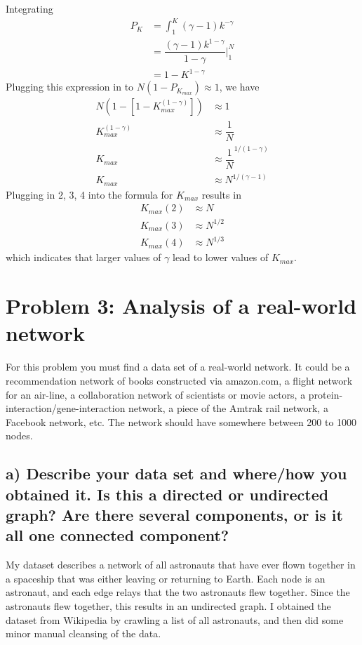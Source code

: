 \documentclass{tufte-handout}
\begin{document}
Integrating
\begin{align*}
P_K &= \int_1^K (\gamma - 1) k^{- \gamma} \\
    &= \dfrac{(\gamma - 1) k^{1 - \gamma}}{1 - \gamma} |_1^N \\
    &= 1 - K^{1-\gamma}
\end{align*}
Plugging this expression in to $N(1-P_{K_{max}}) \approx 1$, we have
\begin{align*}
N(1 - [1 - K_{max}^{(1-\gamma)}]) &\approx 1 \\
K_{max}^{(1-\gamma)} &\approx \dfrac{1}{N} \\
K_{max} &\approx \dfrac{1}{N}^{1/{(1-\gamma)}} \\
K_{max} & \approx N^{1/(\gamma-1)}
\end{align*}
Plugging in 2, 3, 4 into the formula for $K_{max}$ results in
\begin{align*}
K_{max}(2) & \approx N \\
K_{max}(3) & \approx N^{1/2} \\
K_{max}(4) & \approx N^{1/3}
\end{align*}
which indicates that larger values of $\gamma$ lead to lower values of $K_{max}$.

\section{Problem 3: Analysis of a real-world network}

For this problem you must find a data set of a real-world network. It could be a recommendation network of books constructed via amazon.com, a flight network for an air-line, a collaboration network of scientists or movie actors, a protein-interaction/gene-interaction network, a piece of the Amtrak rail network, a Facebook network, etc. The network should have somewhere between 200 to 1000 nodes.

\subsection{a) Describe your data set and where/how you obtained it. Is this a directed or undirected graph? Are there several components, or is it all one connected component?}

My dataset describes a network of all astronauts that have ever flown together in a spaceship that was either leaving or returning to Earth. Each node is an astronaut, and each edge relays that the two astronauts flew together. Since the astronauts flew together, this results in an undirected graph. I obtained the dataset from Wikipedia by crawling a list of all astronauts, and then did some minor manual cleansing of the data.
\end{document}
